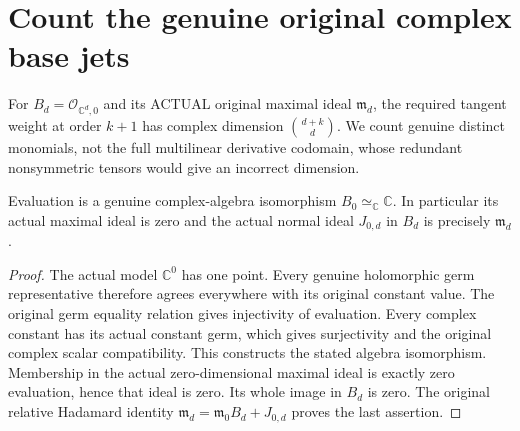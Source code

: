 \section{Count the genuine original complex base jets}

For $B_d=\mathcal O_{\mathbb C^d,0}$ and its ACTUAL original maximal
ideal $\mathfrak m_d$, the required tangent weight at order $k+1$ has
complex dimension $\binom{d+k}{d}$. We count genuine distinct monomials,
not the full multilinear derivative codomain, whose redundant nonsymmetric
tensors would give an incorrect dimension.

\begin{lemma}
\label{hir:relative-normal-actual-zero-base-complex-algebra}
\leanok
Evaluation is a genuine complex-algebra isomorphism $B_0\simeq_{\mathbb C}\mathbb C$.
In particular its actual maximal ideal is zero and the actual normal ideal
$J_{0,d}$ in $B_d$ is precisely $\mathfrak m_d$.
\end{lemma}
\begin{proof}
The actual model $\mathbb C^0$ has one point. Every genuine holomorphic
germ representative therefore agrees everywhere with its original constant
value. The original germ equality relation gives injectivity of evaluation.
Every complex constant has its actual constant germ, which gives surjectivity
and the original complex scalar compatibility. This constructs the stated
algebra isomorphism. Membership in the actual zero-dimensional maximal ideal
is exactly zero evaluation, hence that ideal is zero. Its whole image in
$B_d$ is zero. The original relative Hadamard identity
$\mathfrak m_d=\mathfrak m_0B_d+J_{0,d}$ proves the last assertion.
\end{proof}

